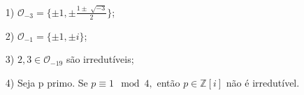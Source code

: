 \documentclass[AlgebraII/algebraII_notes.tex]{subfiles}
\begin{document}
\begin{example}
	\begin{itemize}
		\item[1)] \(\mathcal{O}_{-3} = \{\pm1, \pm \frac{1\pm \sqrt[]{-3}}{2}\}\);
		\item[2)] \(\mathcal{O}_{-1} = \{\pm1, \pm i\}\);
		\item[3)] \(2, 3\in \mathcal{O}_{-19}\) são irredutíveis;
		\item[4)] Seja p primo. Se \(p\equiv 1 \mod 4,\) então \(p\in \mathbb{Z}[i]\) não é irredutível.
	\end{itemize}
\end{example}
\end{document}
